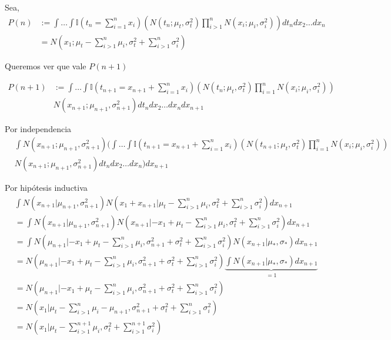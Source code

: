 \documentclass[11pt,twoside, spanish]{report} %
\begin{document}
Sea,
\begin{equation}
	\begin{split}
		P(n) &:=\int \dots \int \mathbb{I}(t_n= \sum_{i=1}^n x_i ) \left( N(t_n;\mu_t,\sigma_t^2)\prod_{i>1}^n N(x_i;\mu_i,\sigma_i^2) \right)  dt_ndx_2 \dots dx_n\\ &=N\left(x_1;\mu_t-\sum_{i>1}^n \mu_i,\sigma_t^2+\sum_{i>1}^n\sigma_i^2\right)
	\end{split}
\end{equation}

Queremos ver que vale $P(n+1)$

\begin{equation}
	\begin{split}
		P(n+1) &:= \int \dots \int \mathbb{I}(t_{n+1}=  x_{n+1} + \sum_{i=1}^{n} x_i ) \left(N(t_n;\mu_t,\sigma_t^2) \prod_{i=1}^{n} N(x_i;\mu_i,\sigma_i^2) \right)\\
		& N(x_{n+1};\mu_{n+1},\sigma_{n+1}^2) dt_ndx_2 \dots dx_{n} dx_{n+1}
	\end{split}
\end{equation}

Por independencia
\begin{equation}
	\begin{split}
		&\int N(x_{n+1};\mu_{n+1},\sigma_{n+1}^2)\Big( \int \dots \int \mathbb{I}(t_{n+1}=  x_{n+1} + \sum_{i=1}^{n} x_i ) \left(N(t_{n+1};\mu_t,\sigma_t^2) \prod_{i=1}^{n} N(x_i;\mu_i,\sigma_i^2) \right)\\
		& N(x_{n+1};\mu_{n+1},\sigma_{n+1}^2) dt_ndx_2 \dots dx_{n} \Big) dx_{n+1}
	\end{split}
\end{equation}


Por hip\'otesis inductiva
\begin{equation}
	\begin{split}
		&\int N(x_{n+1}|\mu_{n+1},\sigma_{n+1}^2) N\left(x_1+x_{n+1}|\mu_t-\sum_{i>1}^n \mu_i,\sigma_t^2+\sum_{i>1}^n\sigma_i^2\right) dx_{n+1} \\
		&=\int N(x_{n+1}|\mu_{n+1},\sigma_{n+1}^2) N\left(x_{n+1}|-x_1+\mu_t-\sum_{i>1}^n \mu_i,\sigma_t^2+\sum_{i>1}^n\sigma_i^2\right) dx_{n+1} \\
		&=\int N(\mu_{n+1}|-x_1+\mu_t-\sum_{i>1}^n \mu_i,\sigma_{n+1}^2+\sigma_t^2+\sum_{i>1}^n\sigma_i^2) N\left(x_{n+1}|\mu_{\ast},\sigma_{\ast}\right) dx_{n+1} \\
		&= N(\mu_{n+1}|-x_1+\mu_t-\sum_{i>1}^n \mu_i,\sigma_{n+1}^2+\sigma_t^2+\sum_{i>1}^n\sigma_i^2) \underbrace{\int N\left(x_{n+1}|\mu_{\ast},\sigma_{\ast}\right) dx_{n+1}}_{=1} \\
		&= N(\mu_{n+1}|-x_1+\mu_t-\sum_{i>1}^n \mu_i,\sigma_{n+1}^2+\sigma_t^2+\sum_{i>1}^n\sigma_i^2)\\
		&= N(x_1|\mu_t-\sum_{i>1}^n \mu_i-\mu_{n+1},\sigma_{n+1}^2+\sigma_t^2+\sum_{i>1}^n\sigma_i^2)\\
		&= N(x_1|\mu_t-\sum_{i>1}^{n+1} \mu_i,\sigma_t^2+\sum_{i>1}^{n+1}\sigma_i^2)
	\end{split}
\end{equation}
\end{document}
